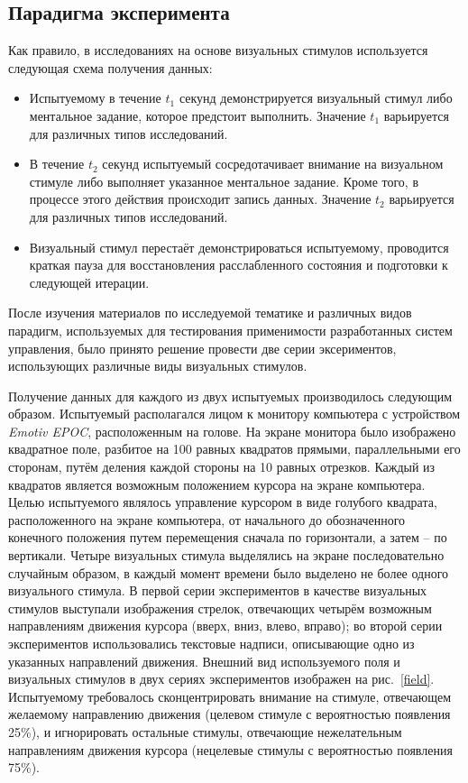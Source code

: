 \documentclass[12pt,a4paper,oneside,fleqn,leqno]{article}
\begin{document}
\subsection{Парадигма эксперимента}
	\par Как правило, в исследованиях на основе визуальных стимулов используется следующая схема получения данных:
	\begin{itemize}
	\item
	Испытуемому в течение $t_1$ секунд демонстрируется визуальный стимул либо ментальное задание, которое предстоит выполнить. Значение $t_1$ варьируется для различных типов исследований.
	\item
	В течение $t_2$ секунд испытуемый сосредотачивает внимание на визуальном стимуле либо выполняет указанное ментальное задание. Кроме того, в процессе этого действия происходит запись данных. Значение $t_2$ варьируется для различных типов исследований.
	\item
	Визуальный стимул перестаёт демонстрироваться испытуемому, проводится краткая пауза для восстановления расслабленного состояния и подготовки к следующей итерации.
	\end{itemize}

	\par После изучения материалов по исследуемой тематике и различных видов парадигм, используемых для тестирования применимости разработанных систем управления, было принято решение провести две серии эксериментов, использующих различные виды визуальных стимулов. 
	\par Получение данных для каждого из двух испытуемых производилось следующим образом. Испытуемый располагался лицом к монитору компьютера с устройством {\it Emotiv EPOC}, расположенным на голове. На экране монитора было изображено квадратное поле, разбитое на 100 равных квадратов прямыми, параллельными его сторонам, путём деления каждой стороны на 10 равных отрезков. Каждый из квадратов является возможным положением курсора на экране компьютера. Целью испытуемого являлось управление курсором в виде голубого квадрата, расположенного на экране компьютера, от начального до обозначенного конечного положения путем перемещения сначала по горизонтали, а затем -- по вертикали. Четыре визуальных стимула выделялись на экране последовательно случайным образом, в каждый момент времени было выделено не более одного визуального стимула. В первой серии экспериментов в качестве визуальных стимулов выступали изображения стрелок, отвечающих четырём возможным направлениям движения курсора (вверх, вниз, влево, вправо); во второй серии экспериментов использовались текстовые надписи, описывающие одно из указанных направлений движения. Внешний вид используемого поля и визуальных стимулов в двух сериях экспериментов изображен на рис.~\ref{field}. Испытуемому требовалось сконцентрировать внимание на стимуле, отвечающем желаемому направлению движения (целевом стимуле с вероятностью появления 25\%), и игнорировать остальные стимулы, отвечающие нежелательным направлениям движения курсора (нецелевые стимулы с вероятностью появления 75\%).
\end{document}
